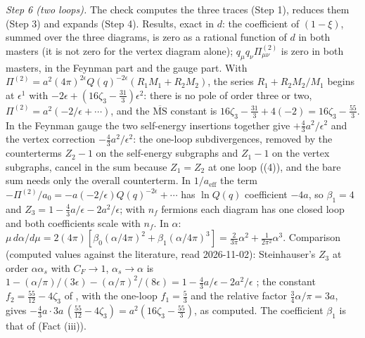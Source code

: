 \emph{Step 6 (two loops).} The check computes the three traces (Step 1), reduces them (Step 3) and expands (Step 4). Results, exact in $d$: the coefficient of $(1 - \xi)$, summed over the three diagrams, is zero as a rational function of $d$ in both masters (it is not zero for the vertex diagram alone); $q_{\mu}q_{\nu}\Pi^{(2)}_{\mu\nu}$ is zero in both masters, in the Feynman part and the gauge part. With $\Pi^{(2)} = a^{2}(4\pi)^{2\epsilon}Q(q)^{-2\epsilon}(R_{1}M_{1} + R_{2}M_{2})$, the series $R_{1} + R_{2}M_{2}/M_{1}$ begins at $\epsilon^{1}$ with $-2\epsilon + (16\zeta_{3} - \tfrac{31}{3})\epsilon^{2}$: there is no pole of order three or two, $\Pi^{(2)} = a^{2}(-2/\epsilon + \cdots)$, and the $\overline{\mathrm{MS}}$ constant is $16\zeta_{3} - \tfrac{31}{3} + 4(-2) = 16\zeta_{3} - \tfrac{55}{3}$. In the Feynman gauge the two self-energy insertions together give $+\tfrac43a^{2}/\epsilon^{2}$ and the vertex correction $-\tfrac43a^{2}/\epsilon^{2}$: the one-loop subdivergences, removed by the counterterms $Z_{2} - 1$ on the self-energy subgraphs and $Z_{1} - 1$ on the vertex subgraphs, cancel in the sum because $Z_{1} = Z_{2}$ at one loop ((4)), and the bare sum needs only the overall counterterm. In $1/a_{\mathrm{eff}}$ the term $-\Pi^{(2)}/a_{0} = -a(-2/\epsilon)Q(q)^{-2\epsilon} + \cdots$ has $\ln Q(q)$ coefficient $-4a$, so $\beta_{1} = 4$ and $Z_{3} = 1 - \tfrac43 a/\epsilon - 2a^{2}/\epsilon$; with $n_{f}$ fermions each diagram has one closed loop and both coefficients scale with $n_{f}$. In $\alpha$: $\mu\,d\alpha/d\mu = 2(4\pi)[\beta_{0}(\alpha/4\pi)^{2} + \beta_{1}(\alpha/4\pi)^{3}] = \tfrac{2}{3\pi}\alpha^{2} + \tfrac{1}{2\pi^{2}}\alpha^{3}$. Comparison (computed values against the literature, read 2026-11-02): Steinhauser's $Z_{3}$ at order $\alpha\alpha_{s}$ with $C_{F} \to 1$, $\alpha_{s} \to \alpha$ is $1 - (\alpha/\pi)/(3\epsilon) - (\alpha/\pi)^{2}/(8\epsilon) = 1 - \tfrac43a/\epsilon - 2a^{2}/\epsilon$ \cite{Steinhauser2002}; the constant $f_{2} = \tfrac{55}{12} - 4\zeta_{3}$ of \cite{FanchiottiKniehlSirlin1993}, with the one-loop $f_{1} = \tfrac53$ and the relative factor $\tfrac34\alpha/\pi = 3a$, gives $-\tfrac43a\cdot 3a\,(\tfrac{55}{12} - 4\zeta_{3}) = a^{2}(16\zeta_{3} - \tfrac{55}{3})$, as computed. The coefficient $\beta_{1}$ is that of \cite{JostLuttinger1950} (Fact (iii)).

